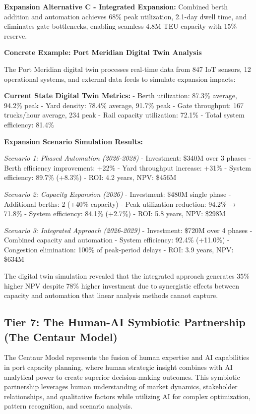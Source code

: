 \documentclass{article}
\begin{document}
\textbf{Expansion Alternative C - Integrated Expansion:} Combined berth addition and automation achieves 68\% peak utilization, 2.1-day dwell time, and eliminates gate bottlenecks, enabling seamless 4.8M TEU capacity with 15\% reserve.

\textbf{Concrete Example: Port Meridian Digital Twin Analysis}

The Port Meridian digital twin processes real-time data from 847 IoT sensors, 12 operational systems, and external data feeds to simulate expansion impacts:

\textbf{Current State Digital Twin Metrics:}
- Berth utilization: 87.3\% average, 94.2\% peak
- Yard density: 78.4\% average, 91.7\% peak  
- Gate throughput: 167 trucks/hour average, 234 peak
- Rail capacity utilization: 72.1\%
- Total system efficiency: 81.4\%

\textbf{Expansion Scenario Simulation Results:}

\textit{Scenario 1: Phased Automation (2026-2028)}
- Investment: \$340M over 3 phases
- Berth efficiency improvement: +22\%
- Yard throughput increase: +31\%
- System efficiency: 89.7\% (+8.3\%)
- ROI: 4.2 years, NPV: \$456M

\textit{Scenario 2: Capacity Expansion (2026)}  
- Investment: \$480M single phase
- Additional berths: 2 (+40\% capacity)
- Peak utilization reduction: 94.2\% → 71.8\%
- System efficiency: 84.1\% (+2.7\%)
- ROI: 5.8 years, NPV: \$298M

\textit{Scenario 3: Integrated Approach (2026-2029)}
- Investment: \$720M over 4 phases
- Combined capacity and automation
- System efficiency: 92.4\% (+11.0\%)
- Congestion elimination: 100\% of peak-period delays
- ROI: 3.9 years, NPV: \$634M

The digital twin simulation revealed that the integrated approach generates 35\% higher NPV despite 78\% higher investment due to synergistic effects between capacity and automation that linear analysis methods cannot capture.

\subsection{Tier 7: The Human-AI Symbiotic Partnership (The Centaur Model)}

The Centaur Model represents the fusion of human expertise and AI capabilities in port capacity planning, where human strategic insight combines with AI analytical power to create superior decision-making outcomes. This symbiotic partnership leverages human understanding of market dynamics, stakeholder relationships, and qualitative factors while utilizing AI for complex optimization, pattern recognition, and scenario analysis.
\end{document}

